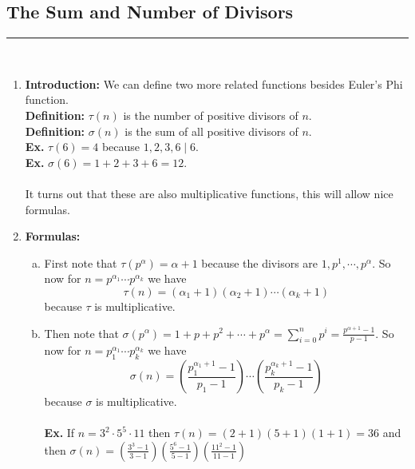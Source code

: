 \documentclass[class=article, crop=false]{standalone}
\begin{document}
\subsection{The Sum and Number of Divisors}
\rule{\textwidth}{1pt}\\
\begin{enumerate}[1.]
\item \textbf{Introduction:} We can define two more related functions besides Euler's Phi function. \\
\textbf{Definition:} $\tau (n)$ is the number of positive divisors of $n$. \\
\textbf{Definition:} $\sigma (n)$ is the sum of all positive divisors of $n$. \\
\textbf{Ex.} $\tau (6) = 4$ because $1,2,3,6\mid 6$. \\
\textbf{Ex.} $\sigma (6) = 1+2+3+6 = 12$. \\\\
It turns out that these are also multiplicative functions, this will allow nice formulas.

\item \textbf{Formulas:}
\begin{enumerate}[(a)]
	\item First note that $\tau (p^{\alpha}) = \alpha + 1$ because the divisors are 
	$1,p^1,\cdots, p^{\alpha}$. So now for $n = p^{\alpha_1}\cdots p^{\alpha_k}$ we have 
	$$\tau (n) = (\alpha_1 + 1)(\alpha_2 + 1)\cdots (\alpha_k + 1)$$ 
	because $\tau$ is multiplicative.

	\item Then note that $\sigma(p^{\alpha}) = 1+p+p^2+\cdots +p^{\alpha} = \sum_{i=0}^{n} p^{i} = \frac{p^{\alpha+1}-1}{p-1}$.
	So now for $n = p_1^{\alpha_1}\cdots p_k^{\alpha_k}$ we have
	$$\sigma (n) = \left(\frac{p_1^{\alpha_1 + 1}-1}{p_1 -1}\right)\cdots \left(\frac{p_k^{\alpha_k +1}-1}{p_k-1}\right)$$
	because $\sigma$ is multiplicative. \\\\
	\textbf{Ex.} If $n = 3^2\cdot 5^5\cdot 11$ then $\tau(n) = (2+1)(5+1)(1+1) = 36$ and then
	$\sigma(n) = \left(\frac{3^3 - 1}{3-1}\right)\left(\frac{5^6-1}{5-1}\right)\left(\frac{11^2-1}{11-1}\right)$
\end{enumerate}


\end{enumerate}
\end{document}
